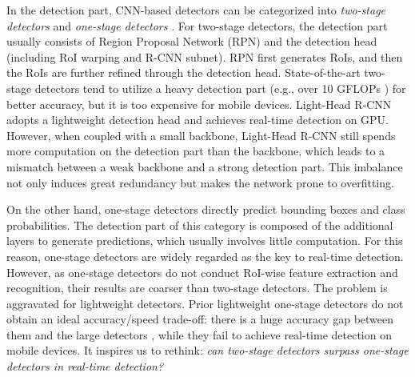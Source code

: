 \documentclass[10pt,twocolumn,letterpaper]{article}
\begin{document}

In the detection part, CNN-based detectors can be categorized into \emph{two-stage detectors} \cite{ren2015faster,dai2016r,lin2017feature,li2017light} and \emph{one-stage detectors} \cite{redmon2016you,liu2016ssd,redmon2017yolo9000,lin2017focal}.
For two-stage detectors, the detection part usually consists of Region Proposal Network (RPN) \cite{ren2015faster} and the detection head (including RoI warping and R-CNN subnet).
RPN first generates RoIs, and then the RoIs are further refined through the detection head.
State-of-the-art two-stage detectors tend to utilize a heavy detection part (e.g., over 10 GFLOPs \cite{ren2015faster,he2016deep,dai2016r,lin2017feature,cai2017cascade}) for better accuracy, but it is too expensive for mobile devices.
Light-Head R-CNN \cite{li2017light} adopts a lightweight detection head and achieves real-time detection on GPU.
However, when coupled with a small backbone, Light-Head R-CNN still spends more computation on the detection part than the backbone, which leads to a mismatch between a weak backbone and a strong detection part.
This imbalance not only induces great redundancy but makes the network prone to overfitting.

On the other hand, one-stage detectors directly predict bounding boxes and class probabilities.
The detection part of this category is composed of the additional layers to generate predictions, which usually involves little computation.
For this reason, one-stage detectors are widely regarded as the key to real-time detection.
However, as one-stage detectors do not conduct RoI-wise feature extraction and recognition, their results are coarser than two-stage detectors.
The problem is aggravated for lightweight detectors.
Prior lightweight one-stage detectors \cite{howard2017mobilenets,sandler2018mobilenetv2,wang2018pelee,li2018tiny} do not obtain an ideal accuracy/speed trade-off: there is a huge accuracy gap between them and the large detectors \cite{liu2016ssd,redmon2017yolo9000}, while they fail to achieve real-time detection on mobile devices.
It inspires us to rethink: \emph{can two-stage detectors surpass one-stage detectors in real-time detection?}
\end{document}
